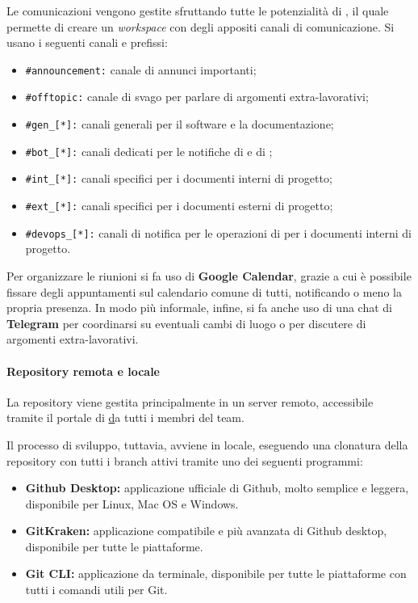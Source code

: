 	Le comunicazioni vengono gestite sfruttando tutte le potenzialità di , il quale permette di creare un \textit{workspace} con degli appositi canali di comunicazione. Si usano i seguenti canali e prefissi:
	\begin{itemize}
		\item \verb!#announcement:! canale di annunci importanti;
		\item \verb!#offtopic:! canale di svago per parlare di argomenti extra-lavorativi;
		\item \verb!#gen_[*]:! canali generali per il software e la documentazione;
		\item \verb!#bot_[*]:! canali dedicati per le notifiche di  e di ;
		\item \verb!#int_[*]:! canali specifici per i documenti interni di progetto;
		\item \verb!#ext_[*]:! canali specifici per i documenti esterni di progetto;
		\item \verb!#devops_[*]:! canali di notifica per le operazioni di  per i documenti interni di progetto.
	\end{itemize}

	Per organizzare le riunioni si fa uso di \textbf{Google Calendar}, grazie a cui è possibile fissare degli appuntamenti sul calendario comune di tutti, notificando o meno la propria presenza.
	In modo più informale, infine, si fa anche uso di una chat di \textbf{Telegram} per coordinarsi su eventuali cambi di luogo o per discutere di argomenti extra-lavorativi.

	\paragraph{Repository remota e locale}

	La repository viene gestita principalmente in un server remoto, accessibile tramite il portale di \href{Github.com} da tutti i membri del team.

	Il processo di sviluppo, tuttavia, avviene in locale, eseguendo una clonatura della repository con tutti i branch attivi tramite uno dei seguenti programmi:

	\begin{itemize}
		\item \textbf{Github Desktop:} applicazione ufficiale di Github, molto semplice e leggera, disponibile per Linux, Mac OS e Windows.
		\item \textbf{GitKraken:} applicazione compatibile e più avanzata di Github desktop, disponibile per tutte le piattaforme.
		\item \textbf{Git CLI:} applicazione da terminale, disponibile per tutte le piattaforme con tutti i comandi utili per Git.
	\end{itemize}

